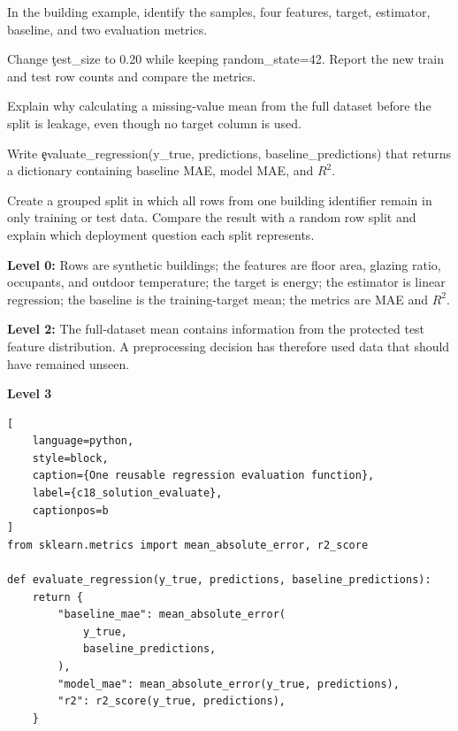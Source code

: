

In the building example, identify the samples, four features, target, estimator,
baseline, and two evaluation metrics.


Change \c{test_size} to 0.20 while keeping \c{random_state=42}. Report the new
train and test row counts and compare the metrics.


Explain why calculating a missing-value mean from the full dataset before the
split is leakage, even though no target column is used.


Write \c{evaluate_regression(y_true, predictions, baseline_predictions)} that
returns a dictionary containing baseline MAE, model MAE, and $R^2$.


Create a grouped split in which all rows from one building identifier remain in
only training or test data. Compare the result with a random row split and
explain which deployment question each split represents.


\textbf{Level 0:} Rows are synthetic buildings; the features are floor area,
glazing ratio, occupants, and outdoor temperature; the target is energy; the
estimator is linear regression; the baseline is the training-target mean; the
metrics are MAE and $R^2$.

\textbf{Level 2:} The full-dataset mean contains information from the protected
test feature distribution. A preprocessing decision has therefore used data
that should have remained unseen.

\textbf{Level 3}

\begin{lstlisting}[
    language=python,
    style=block,
    caption={One reusable regression evaluation function},
    label={c18_solution_evaluate},
    captionpos=b
]
from sklearn.metrics import mean_absolute_error, r2_score

def evaluate_regression(y_true, predictions, baseline_predictions):
    return {
        "baseline_mae": mean_absolute_error(
            y_true,
            baseline_predictions,
        ),
        "model_mae": mean_absolute_error(y_true, predictions),
        "r2": r2_score(y_true, predictions),
    }
\end{lstlisting}

